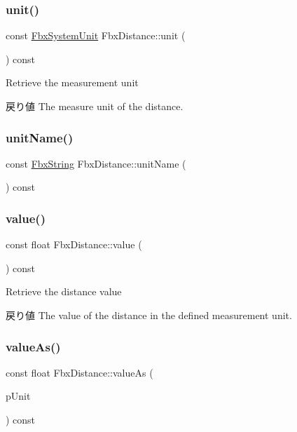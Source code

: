 \subsubsection{\texorpdfstring{unit()}{unit()}}
{\footnotesize\ttfamily const \hyperlink{class_fbx_system_unit}{Fbx\+System\+Unit} Fbx\+Distance\+::unit (\begin{DoxyParamCaption}{ }\end{DoxyParamCaption}) const}

Retrieve the measurement unit \begin{DoxyReturn}{戻り値}
The measure unit of the distance. 
\end{DoxyReturn}
\mbox{\label{class_fbx_distance_ada4c11c436abc26a08deb903a0c3de1d}} 
\subsubsection{\texorpdfstring{unit\+Name()}{unitName()}}
{\footnotesize\ttfamily const \hyperlink{class_fbx_string}{Fbx\+String} Fbx\+Distance\+::unit\+Name (\begin{DoxyParamCaption}{ }\end{DoxyParamCaption}) const}

\mbox{\label{class_fbx_distance_a00bb7d52cd3f2494429bf7126764d2c4}} 
\subsubsection{\texorpdfstring{value()}{value()}}
{\footnotesize\ttfamily const float Fbx\+Distance\+::value (\begin{DoxyParamCaption}{ }\end{DoxyParamCaption}) const}

Retrieve the distance value \begin{DoxyReturn}{戻り値}
The value of the distance in the defined measurement unit. 
\end{DoxyReturn}
\mbox{\label{class_fbx_distance_aab3c152aa5f66f2dad580d4a0686ce7f}} 
\subsubsection{\texorpdfstring{value\+As()}{valueAs()}}
{\footnotesize\ttfamily const float Fbx\+Distance\+::value\+As (\begin{DoxyParamCaption}\item[{const \hyperlink{class_fbx_system_unit}{Fbx\+System\+Unit} \&}]{p\+Unit }\end{DoxyParamCaption}) const}


